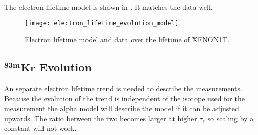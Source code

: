 \bgroup
\def\arraystretch{1.2}
\begin{table}
\centering
{}
\caption{Impurity drops during XENON1T.}
\label{tab:electron_lifetime_model_detector_effects_spikes_dates}
\end{table}
\egroup

The electron lifetime model is shown in .  It matches the data well.

\begin{figure}
\centering
\texttt{[image: electron\_lifetime\_evolution\_model]}
\caption{Electron lifetime model and data over the lifetime of XENON1T.}
\label{fig:elifetime_fit_results_elifetime}
\end{figure}


\subsection[$\mathrm{^{83m}Kr}$ Evolution][$\mathrm{^{83m}Kr}$ Evolution]{$\mathbf{^{83m}Kr}$ Evolution}
\label{subsec:elifetime_fit_kr}
An separate electron lifetime trend is needed to describe the \metakr measurements.  Because the evolution of the trend is independent
of the isotope used for the measurement the alpha model will describe the \metakr model if it can be adjusted upwards.  The ratio
between the two becomes larger at higher $\tau_e$ so scaling by a constant will not work.

